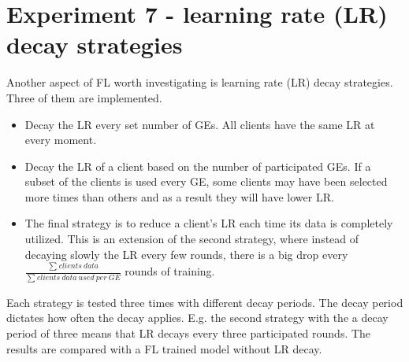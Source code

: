 \section{Experiment 7 - learning rate (LR) decay strategies}
Another aspect of FL worth investigating is learning rate (LR) decay strategies. Three of them are implemented.
\begin{itemize}
    \item Decay the LR every set number of GEs. All clients have the same LR at every moment.
    \item Decay the LR of a client based on the number of participated GEs. If a subset of the clients is used every GE, some clients may have been selected more times than others and as a result they will have lower LR.
    \item The final strategy is to reduce a client's LR each time its data is completely utilized. This is an extension of the second strategy, where instead of decaying slowly the LR every few rounds, there is a big drop every \( \displaystyle \frac{\sum_{}^{}clients\ data}{\sum_{}^{} clients\ data\ used\ per\ GE} \) rounds of training.
\end{itemize}
Each strategy is tested three times with different decay periods. The decay period dictates how often the decay applies. E.g. the second strategy with the a decay period of three means that LR decays every three participated rounds. The results are compared with a FL trained model without LR decay.

\begin{table}[H]
    \center
    \hspace*{-9mm} 
    \caption{Experiment 7 parameters}
\end{table}

